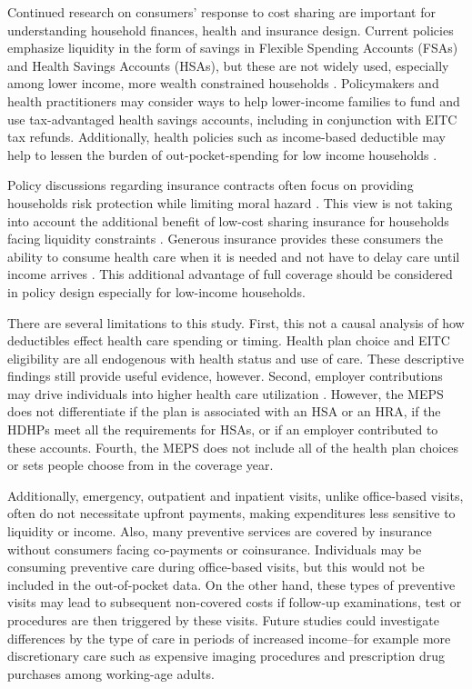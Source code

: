 \documentclass[smallcondensed,referee]{svjour3}
\begin{document}
Continued research on consumers' response to cost sharing are important for understanding household finances, health and insurance design. Current policies emphasize liquidity in the form of savings in Flexible Spending Accounts (FSAs) and Health Savings Accounts (HSAs), but these are not widely used, especially among lower income, more wealth constrained households \citep{helmchen_health_2015}. Policymakers and health practitioners may consider ways to help lower-income families to fund and use tax-advantaged health savings accounts, including in conjunction with EITC tax refunds.  Additionally, health policies such as income-based deductible may help to lessen the burden of out-pocket-spending for low income households \citep{sherman_health_2017}.

Policy discussions regarding insurance contracts often focus on providing households risk protection while limiting moral hazard \citep{gross_liquidity_2020}. This view is not taking into account the additional benefit of low-cost sharing insurance for households facing liquidity constraints \citep{ericson_liquidity_2018}. Generous insurance provides these consumers the ability to consume health care when it is needed and not have to delay care until income arrives \citep{gross_liquidity_2020}. This additional advantage of full coverage should be considered in policy design especially for low-income households. 

There are several limitations to this study. First, this not a causal analysis of how deductibles effect health care spending or timing. Health plan choice and EITC eligibility are all endogenous with health status and use of care. These descriptive findings still provide useful evidence, however. Second, employer contributions may drive individuals into higher health care utilization \citep{haviland_how_2011}. However, the MEPS does not differentiate if the plan is associated with an HSA or an HRA, if the HDHPs meet all the requirements for HSAs, or if an employer contributed to these accounts. Fourth, the MEPS does not include all of the health plan choices or sets people choose from in the coverage year. 

Additionally, emergency, outpatient and inpatient visits, unlike office-based visits, often do not necessitate upfront payments, making  expenditures less sensitive to liquidity or income. Also, many preventive services are covered by insurance without consumers facing co-payments or coinsurance. Individuals may be consuming preventive care during office-based visits, but this would not be included in the out-of-pocket data.  On the other hand, these types of preventive visits may lead to subsequent non-covered costs if follow-up examinations, test or procedures are then triggered by these visits.  Future studies could investigate differences by the type of care in periods of increased income--for example more discretionary care such as expensive imaging procedures and prescription drug purchases among working-age adults. 
\end{document}
